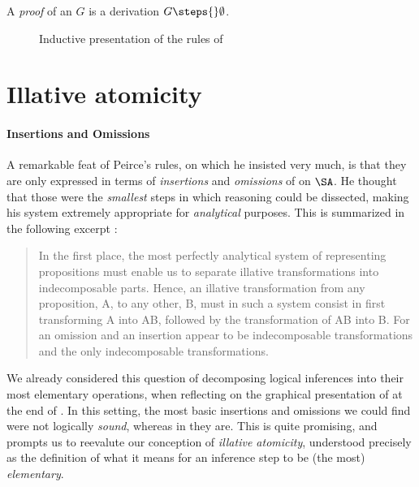 \begin{scope}
\begin{definition}[Proof]
  A \emph{proof} of an  $G$ is a derivation $G \steps{} \emptyset$.
\end{definition}

\begin{figure}
  
  \caption{Inductive presentation of the rules of }
\end{figure}

\section{Illative atomicity}

\paragraph{Insertions and Omissions}

A remarkable feat of Peirce's rules, on which he insisted very much, is that
they are only expressed in terms of \emph{insertions} and \emph{omissions} of
 on $\SA$. He thought that those were the \emph{smallest} steps in which
reasoning could be dissected, making his system extremely appropriate for
\emph{analytical} purposes. This is summarized in the following excerpt
:

\begin{quote}
  In the first place, the most perfectly analytical system of representing
propositions must enable us to separate illative transformations into
indecomposable parts. Hence, an illative transformation from any proposition, A,
to any other, B, must in such a system consist in first transforming A into AB,
followed by the transformation of AB into B. For an omission and an insertion
appear to be indecomposable transformations and the only indecomposable
transformations.
\end{quote}

We already considered this question of decomposing logical inferences into their
most elementary operations, when reflecting on the graphical presentation of
 at the end of . In this setting, the
most basic insertions and omissions we could find were not logically
\emph{sound}, whereas in  they are. This is quite promising, and
prompts us to reevalute our conception of \emph{illative atomicity}, understood
precisely as the definition of what it means for an inference step to be (the
most) \emph{elementary}.


\end{scope}
